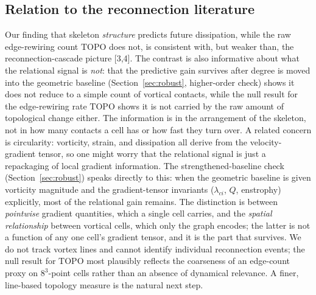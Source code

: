 \documentclass[11pt,a4paper]{article}
\begin{document}
\subsection{Relation to the reconnection literature}
Our finding that skeleton \emph{structure} predicts future dissipation, while the raw edge-rewiring count $\mathrm{TOPO}$ does not, is consistent with, but weaker than, the reconnection-cascade picture [3,4]. The contrast is also informative about what the relational signal is \emph{not}: that the predictive gain survives after degree is moved into the geometric baseline (Section~\ref{sec:robust}, higher-order check) shows it does not reduce to a simple count of vortical contacts, while the null result for the edge-rewiring rate $\mathrm{TOPO}$ shows it is not carried by the raw amount of topological change either. The information is in the arrangement of the skeleton, not in how many contacts a cell has or how fast they turn over. A related concern is circularity: vorticity, strain, and dissipation all derive from the velocity-gradient tensor, so one might worry that the relational signal is just a repackaging of local gradient information. The strengthened-baseline check (Section~\ref{sec:robust}) speaks directly to this: when the geometric baseline is given vorticity magnitude and the gradient-tensor invariants ($\lambda_{ci}$, $Q$, enstrophy) explicitly, most of the relational gain remains. The distinction is between \emph{pointwise} gradient quantities, which a single cell carries, and the \emph{spatial relationship} between vortical cells, which only the graph encodes; the latter is not a function of any one cell's gradient tensor, and it is the part that survives. We do not track vortex lines and cannot identify individual reconnection events; the null result for $\mathrm{TOPO}$ most plausibly reflects the coarseness of an edge-count proxy on $8^3$-point cells rather than an absence of dynamical relevance. A finer, line-based topology measure is the natural next step.
\end{document}
